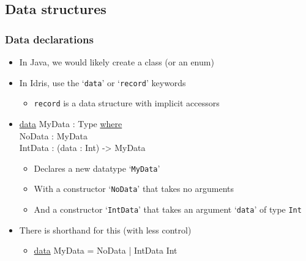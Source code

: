 \documentclass{beamer}
\begin{document}
  \subsection{Data structures}
  \begin{frame}
    \frametitle{Data declarations}

    \begin{itemize}
      \item In Java, we would likely create a class (or an enum)
      \item In Idris, use the `\texttt{data}' or `\texttt{record}' keywords
        \begin{itemize}
          \item \texttt{record} is a data structure with implicit accessors
        \end{itemize}
      \item {\ttfamily
             \underline{data} MyData : Type \underline{where}\\
             \hspace*{1em} NoData : MyData\\
             \hspace*{1em} IntData : (data : Int) -> MyData}
        \begin{itemize}
          \item Declares a new datatype `\texttt{MyData}'
          \item With a constructor `\texttt{NoData}' that takes no arguments
          \item And a constructor `\texttt{IntData}' that takes an argument
                `\texttt{data}' of type \texttt{Int}
        \end{itemize}
      \item There is shorthand for this (with less control)
        \begin{itemize}
          \item {\ttfamily \underline{data} MyData = NoData | IntData Int}
        \end{itemize}
    \end{itemize}
  \end{frame}
\end{document}
